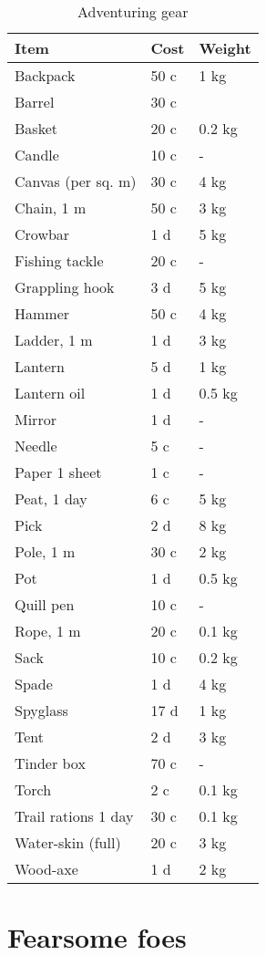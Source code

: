 \documentclass[a4paper,11pt,oneside]{book}
\begin{document}
\begin{table}[ht]
	\centering
	\caption{Adventuring gear}
	\begin{tabular}{|l|l|l|}
		\hline
		Item & Cost & Weight\\ [0.5ex]
		\hline
		Backpack & 50 c & 1 kg\\
		Barrel & 30 c & \\
		Basket & 20 c & 0.2 kg\\
		Candle & 10 c & -\\
		Canvas (per sq. m) & 30 c & 4 kg\\
		Chain, 1 m & 50 c & 3 kg\\
		Crowbar & 1 d & 5 kg\\
		Fishing tackle & 20 c & -\\
		Grappling hook & 3 d & 5 kg\\
		Hammer & 50 c & 4 kg\\
		Ladder, 1 m & 1 d & 3 kg\\
		Lantern & 5 d & 1 kg\\
		Lantern oil & 1 d & 0.5 kg \\
		Mirror & 1 d & -\\
		Needle & 5 c & -\\
		Paper 1 sheet & 1 c & -\\
		Peat, 1 day & 6 c & 5 kg\\
		Pick & 2 d & 8 kg\\
		Pole, 1 m & 30 c & 2 kg\\
		Pot & 1 d & 0.5 kg\\
		Quill pen & 10 c & -\\
		Rope, 1 m & 20 c & 0.1 kg\\
		Sack & 10 c & 0.2 kg\\
		Spade & 1 d & 4 kg\\
		Spyglass & 17 d & 1 kg\\
		Tent & 2 d & 3 kg\\
		Tinder box & 70 c & -\\
		Torch & 2 c & 0.1 kg\\
		Trail rations 1 day & 30 c & 0.1 kg\\
		Water-skin (full) & 20 c & 3 kg\\	
		Wood-axe & 1 d & 2 kg\\	
		\hline
	\end{tabular}
\end{table}


\chapter{Fearsome foes}
\end{document}

